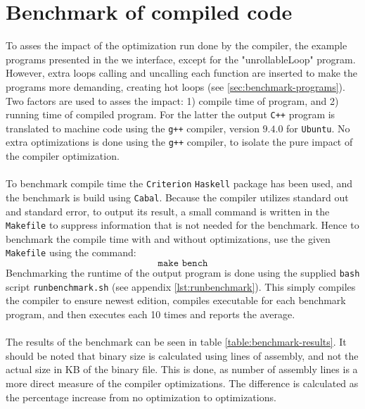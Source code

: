 \section{Benchmark of compiled code}
To asses the impact of the optimization run done by the \lan compiler, the
example programs presented in the we interface, except for the "unrollableLoop" program.
However, extra loops calling and uncalling each function are inserted to make the programs
more demanding, creating hot loops
(see \ref{sec:benchmark-programs}). Two factors are used to asses the impact: 1) compile time
of program, and 2) running time of compiled program. For the latter the output \texttt{C++}
program is translated to machine code using the \texttt{g++} compiler, version $9.4.0$
for \texttt{Ubuntu}. No extra optimizations is done using the \texttt{g++} compiler, to
isolate the pure impact of the \lan compiler optimization.
\\
\\
To benchmark compile time the \texttt{Criterion} \texttt{Haskell} package has been used,
and the benchmark is build using \texttt{Cabal}. Because the \lan compiler utilizes
standard out and standard error, to output its result, a small command is written in the
\texttt{Makefile} to suppress information that is not needed for the benchmark. Hence
to benchmark the compile time with and without optimizations, use the given
\texttt{Makefile} using the command:
$$\texttt{make bench}$$
\noindent
Benchmarking the runtime of the output program is done using the supplied \texttt{bash}
script \texttt{runbenchmark.sh} (see appendix \ref{lst:runbenchmark}). This simply compiles
the \lan compiler to ensure newest edition, compiles executable for each benchmark program,
and then executes each 10 times and reports the average.
\\
\\
The results of the benchmark can be seen in table \ref{table:benchmark-results}.
It should be noted that binary size is calculated using lines of assembly, and not the
actual size in KB of the binary file. This is done, as number of assembly lines is a
more direct measure of the \lan compiler optimizations. The difference is calculated as
the percentage increase from no optimization to optimizations.

